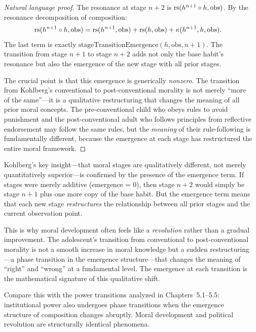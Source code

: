 \begin{proof}[Natural language proof]
The resonance at stage $n+2$ is $\mathrm{rs}(h^{n+1} \circ h, \mathrm{obs})$.
By the resonance decomposition of composition:
\[
  \mathrm{rs}(h^{n+1} \circ h, \mathrm{obs}) = \mathrm{rs}(h^{n+1}, \mathrm{obs})
  + \mathrm{rs}(h, \mathrm{obs}) + \kappa(h^{n+1}, h, \mathrm{obs}).
\]
The last term is exactly $\mathrm{stageTransitionEmergence}(h, \mathrm{obs},
n+1)$. The transition from stage $n+1$ to stage $n+2$ adds not only the
base habit's resonance but also the emergence of the new stage with all
prior stages.

The crucial point is that this emergence is generically \emph{nonzero}.
The transition from Kohlberg's conventional to post-conventional morality
is not merely ``more of the same''---it is a qualitative restructuring that
changes the meaning of all prior moral concepts. The pre-conventional child
who obeys rules to avoid punishment and the post-conventional adult who
follows principles from reflective endorsement may follow the same rules,
but the \emph{meaning} of their rule-following is fundamentally different,
because the emergence at each stage has restructured the entire moral
framework.
\end{proof}

\begin{interpretation}
Kohlberg's key insight---that moral stages are qualitatively different, not
merely quantitatively superior---is confirmed by the presence of the emergence
term. If stages were merely additive (emergence = 0), then stage $n+2$ would
simply be stage $n+1$ plus one more copy of the base habit. But the emergence
term means that each new stage \emph{restructures} the relationship between
all prior stages and the current observation point.

This is why moral development often feels like a \emph{revolution} rather
than a gradual improvement. The adolescent's transition from conventional to
post-conventional morality is not a smooth increase in moral knowledge but
a sudden restructuring---a phase transition in the emergence structure---that
changes the meaning of ``right'' and ``wrong'' at a fundamental level.
The emergence at each transition is the mathematical signature of this
qualitative shift.

Compare this with the power transitions analyzed in Chapters~5.1--5.5:
institutional power also undergoes phase transitions when the emergence
structure of composition changes abruptly. Moral development and political
revolution are structurally identical phenomena.
\end{interpretation}


